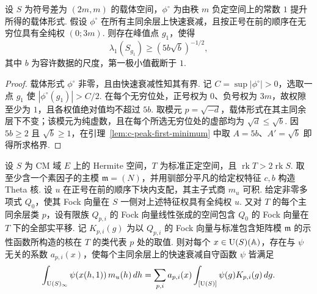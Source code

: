 \begin{lemma}[载体形式的峰值点格界]
\label{lem:c-peak-carrier}
\emitthmsource
设 $S$ 为符号差为 $(2m,m)$ 的载体空间，$\phi^\circ$ 为由秩 $m$ 负定空间上的常数 $1$ 提升所得的载体形式. 假设 $\phi^\circ$ 在所有主同余层上快速衰减，且按正号在前的顺序在无穷位具有全纯权 $(0;3m)$. 则存在峰值点 $g_1$，使得
\[
       \lambda_1(S_{g_1})\ge(5b\sqrt b)^{-1/2},
\]
其中 $b$ 为容许数据的尺度，第一极小值截断于 $1$.
\end{lemma}

\begin{proof}
载体形式 $\phi^\circ$ 非零，且由快速衰减性知其有界. 记 $C=\sup|\phi^\circ|>0$，选取一点 $g_1$ 使 $|\phi^\circ(g_1)|>C/2$. 在每个无穷位处，正号权为 $0$、负号权为 $3m$，故权隙至少为 $1$，且各权值绝对值均不超过 $5b$. 取模元 $p=\sqrt{-d}$，载体形式在其主同余层下不变；该模元为纯虚数，且在每个所选无穷位处的虚部均为 $\sqrt d\le\sqrt b$. 因 $5b\ge2$ 且 $\sqrt b\ge1$，在引理~\ref{lem:c-peak-first-minimum} 中取 $A=5b$、$A'=\sqrt b$ 即得所求格界.
\end{proof}

\begin{lemma}
\label{lem:c-theta-kernel-reproduction}
\emitthmsource
设 $S$ 为 CM 域 $E$ 上的 Hermite 空间，$T$ 为标准正定空间，且 $\operatorname{rk}T>2\operatorname{rk}S$. 取至少含一个素因子的主模 $\mathfrak m=(N)$，并用驯部分平凡的给定权特征 $c,b$ 构造 Theta 核. 设 $u$ 在正号在前的顺序下块内支配，其主子式商 $m_u$ 可积. 给定非零多项式 $Q_0$，使其 Fock 向量在 $S$ 一侧对上述特征权具有全纯权 $u$. 又对 $T$ 的每个主同余层类 $p$，设有限族 $Q_{p,i}$ 的 Fock 向量线性张成的空间包含 $Q_0$ 的 Fock 向量在 $T$ 下的全部实平移. 记 $K_{p,i}(g)$ 为以 $Q_{p,i}$ 的 Fock 向量与标准包含矩阵模 $\mathfrak m$ 的示性函数所构造的核在 $T$ 的类代表 $p$ 处的取值. 则对每个 $x\in \operatorname{U}(S)(\mathbb A)$，存在与 $\psi$ 无关的系数 $a_{p,i}(x)$，使每个主同余层上的快速衰减自守函数 $\psi$ 皆满足
\[
 \int_{\operatorname{U}(S)_\infty}\psi(x(h,1))\,m_u(h)\,dh
 =\sum_{p,i}a_{p,i}(x)\int_{[\operatorname{U}(S)]}\psi(g)K_{p,i}(g)\,dg .
\]
\end{lemma}

